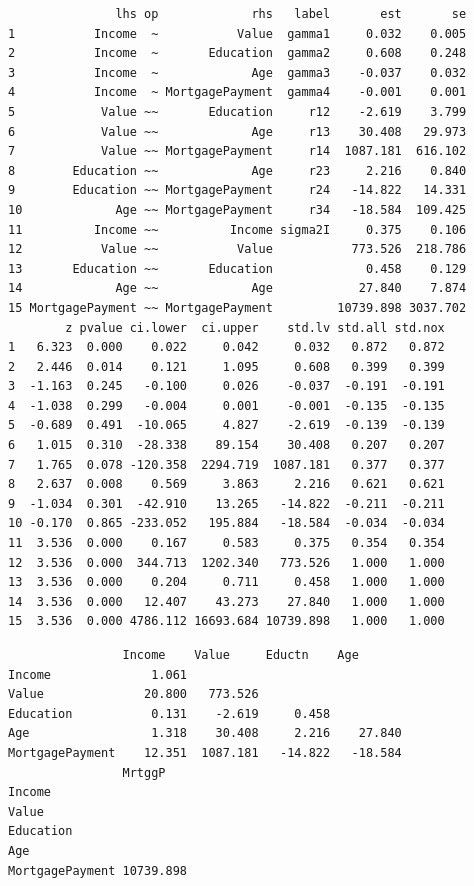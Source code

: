 \begin{verbatim}
               lhs op             rhs   label       est       se
1           Income  ~           Value  gamma1     0.032    0.005
2           Income  ~       Education  gamma2     0.608    0.248
3           Income  ~             Age  gamma3    -0.037    0.032
4           Income  ~ MortgagePayment  gamma4    -0.001    0.001
5            Value ~~       Education     r12    -2.619    3.799
6            Value ~~             Age     r13    30.408   29.973
7            Value ~~ MortgagePayment     r14  1087.181  616.102
8        Education ~~             Age     r23     2.216    0.840
9        Education ~~ MortgagePayment     r24   -14.822   14.331
10             Age ~~ MortgagePayment     r34   -18.584  109.425
11          Income ~~          Income sigma2I     0.375    0.106
12           Value ~~           Value           773.526  218.786
13       Education ~~       Education             0.458    0.129
14             Age ~~             Age            27.840    7.874
15 MortgagePayment ~~ MortgagePayment         10739.898 3037.702
        z pvalue ci.lower  ci.upper    std.lv std.all std.nox
1   6.323  0.000    0.022     0.042     0.032   0.872   0.872
2   2.446  0.014    0.121     1.095     0.608   0.399   0.399
3  -1.163  0.245   -0.100     0.026    -0.037  -0.191  -0.191
4  -1.038  0.299   -0.004     0.001    -0.001  -0.135  -0.135
5  -0.689  0.491  -10.065     4.827    -2.619  -0.139  -0.139
6   1.015  0.310  -28.338    89.154    30.408   0.207   0.207
7   1.765  0.078 -120.358  2294.719  1087.181   0.377   0.377
8   2.637  0.008    0.569     3.863     2.216   0.621   0.621
9  -1.034  0.301  -42.910    13.265   -14.822  -0.211  -0.211
10 -0.170  0.865 -233.052   195.884   -18.584  -0.034  -0.034
11  3.536  0.000    0.167     0.583     0.375   0.354   0.354
12  3.536  0.000  344.713  1202.340   773.526   1.000   1.000
13  3.536  0.000    0.204     0.711     0.458   1.000   1.000
14  3.536  0.000   12.407    43.273    27.840   1.000   1.000
15  3.536  0.000 4786.112 16693.684 10739.898   1.000   1.000
\end{verbatim}

\begin{Shaded}
\begin{Highlighting}[]
\OperatorTok{$}
\end{Highlighting}
\end{Shaded}

\begin{verbatim}
                Income    Value     Eductn    Age      
Income              1.061                              
Value              20.800   773.526                    
Education           0.131    -2.619     0.458          
Age                 1.318    30.408     2.216    27.840
MortgagePayment    12.351  1087.181   -14.822   -18.584
                MrtggP   
Income                   
Value                    
Education                
Age                      
MortgagePayment 10739.898
\end{verbatim}

